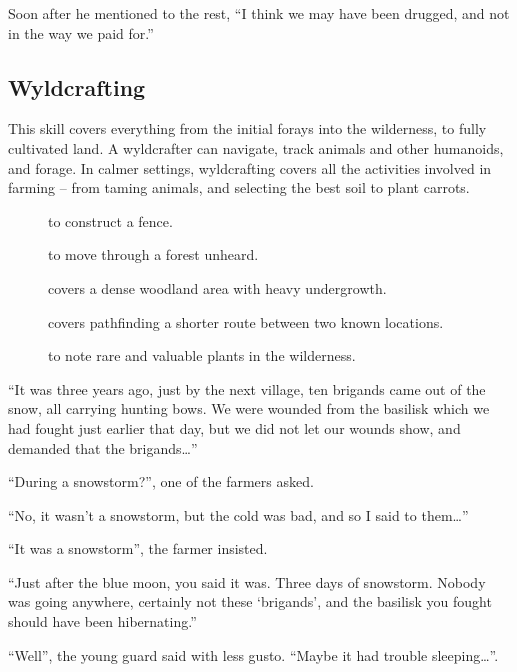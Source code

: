 \begin{multicols}{2}
\begin{exampletext}
  Soon after he mentioned to the rest,
  ``I think we may have been drugged, and not in the way we paid for.''
\end{exampletext}
\fi

\subsection{Wyldcrafting}

This skill covers everything from the initial forays into the wilderness, to fully cultivated land.
A wyldcrafter can navigate, track animals and other humanoids, and forage.
In calmer settings, wyldcrafting covers all the activities involved in farming -- from taming animals, and selecting the best soil to plant carrots.


\begin{description}
  \item[]
    to construct a fence.
  \item[]
    to move through a forest unheard.
  \item[]
    covers a dense woodland area with heavy undergrowth.
  \item[]
    covers pathfinding a shorter route between two known locations.
  \item[]
    to note rare and valuable plants in the wilderness.
\end{description}

\begin{exampletext}
  ``It was three years ago, just by the next \gls{village}, ten brigands came out of the snow, all carrying hunting bows.
  We were wounded from the basilisk which we had fought just earlier that day, but we did not let our wounds show, and demanded that the brigands\ldots''

  ``During a snowstorm?'', one of the farmers asked.

  ``No, it wasn't a snowstorm, but the cold was bad, and so I said to them\ldots''

  ``It was a snowstorm'', the farmer insisted.

  ``Just after the blue moon, you said it was.
  Three days of snowstorm.
  Nobody was going anywhere, certainly not these `brigands', and the basilisk you fought should have been hibernating.''

  ``Well'', the young \gls{guard} said with less gusto.
  ``Maybe it had trouble sleeping\ldots''.

\end{exampletext}

\end{multicols}

